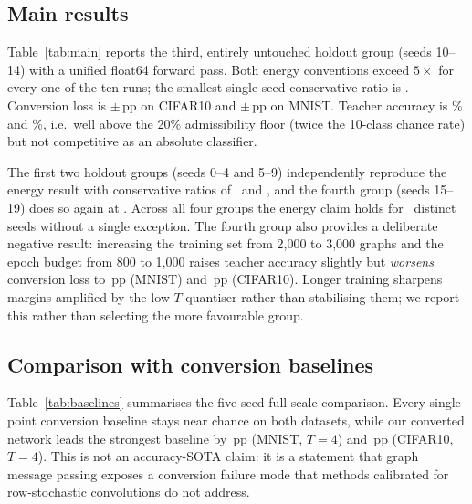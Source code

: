 \subsection{Main results}
\label{ssec:main}

Table~\ref{tab:main} reports the third, entirely untouched holdout group (seeds 10--14) with a unified float64 forward pass. Both energy conventions exceed $5\times$ for every one of the ten runs; the smallest single-seed conservative ratio is \MinCons. Conversion loss is \CIFARLoss$\pm$\CIFARLossStd\,pp on CIFAR10 and \MNISTLoss$\pm$\MNISTLossStd\,pp on MNIST. Teacher accuracy is \CIFARAnn\% and \MNISTAnn\%, i.e.\ well above the 20\% admissibility floor (twice the 10-class chance rate) but not competitive as an absolute classifier.

\begin{table}[t]
\centering
\caption{Five-seed results on untouched holdout seeds 10--14. Energy is a 45\,nm theoretical arithmetic estimate under two conventions; loss is conversion loss in percentage points (lower is better).}
\label{tab:main}

\end{table}

The first two holdout groups (seeds 0--4 and 5--9) independently reproduce the energy result with conservative ratios of \EarlierConsA\ and \EarlierConsB, and the fourth group (seeds 15--19) does so again at \FourthCons. Across all four groups the energy claim holds for \TotalSeeds\ distinct seeds without a single exception. The fourth group also provides a deliberate negative result: increasing the training set from 2,000 to 3,000 graphs and the epoch budget from 800 to 1,000 raises teacher accuracy slightly but \emph{worsens} conversion loss to \EIGHTEENMNISTLoss\,pp (MNIST) and \EIGHTEENCIFARLoss\,pp (CIFAR10). Longer training sharpens margins amplified by the low-$T$ quantiser rather than stabilising them; we report this rather than selecting the more favourable group.

\subsection{Comparison with conversion baselines}
\label{ssec:comparison}

Table~\ref{tab:baselines} summarises the five-seed full-scale comparison. Every single-point conversion baseline stays near chance on both datasets, while our converted network leads the strongest baseline by \MarginMNIST\,pp (MNIST, $T{=}4$) and \MarginCIFAR\,pp (CIFAR10, $T{=}4$). This is not an accuracy-SOTA claim: it is a statement that graph message passing exposes a conversion failure mode that methods calibrated for row-stochastic convolutions do not address.

